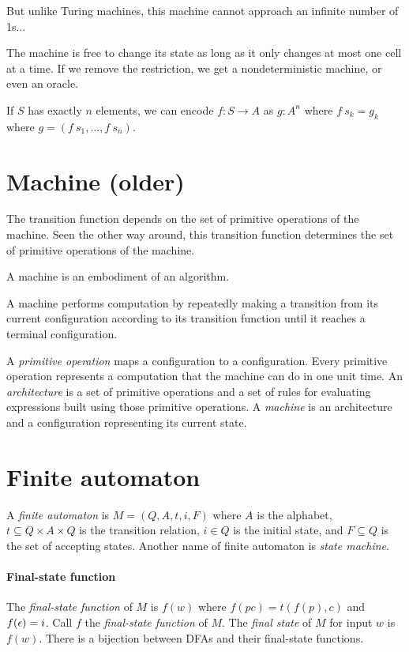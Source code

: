 But unlike Turing machines, this machine cannot approach an infinite number of 1s...

The machine is free to change its state as long as it only changes at most one cell at a time.
If we remove the restriction, we get a nondeterministic machine,
or even an oracle.

If \(S\) has exactly \(n\) elements,
we can encode \(f : S \to A\) as \(g : A^n\)
where \(f~s_k = g_k\) where \(g = (f~s_1, \ldots, f~s_n)\).

\section{Machine (older)}

The transition function depends on the set of primitive operations of the machine.
Seen the other way around, this transition function
determines the set of primitive operations of the machine.

A machine is an embodiment of an algorithm.

A machine performs computation by repeatedly
making a transition from its current configuration
according to its transition function
until it reaches a terminal configuration.

A \emph{primitive operation} maps a configuration to a configuration.
Every primitive operation represents a computation that the machine can do in one unit time.
An \emph{architecture} is a set of primitive operations
and a set of rules for evaluating expressions built using those primitive operations.
A \emph{machine} is an architecture and a configuration representing its current state.

\section{Finite automaton}


A
%
\emph{finite automaton} is \(M = (Q,A,t,i,F)\) where
\(A\) is the alphabet,
\(t \subseteq Q \times A \times Q\) is the transition relation,
\(i \in Q\) is the initial state,
and \(F \subseteq Q\) is the set of accepting states.
Another name of finite automaton is
%
\emph{state machine}.

\paragraph{Final-state function}
The \emph{final-state function} of \(M\) is \(f(w)\)
where \(f(pc) = t(f(p), c)\) and \(f(\epsilon)=i\).
Call \(f\) the \emph{final-state function} of \(M\).
The \emph{final state} of \(M\) for input \(w\) is \(f(w)\).
There is a bijection between DFAs and their final-state functions.

